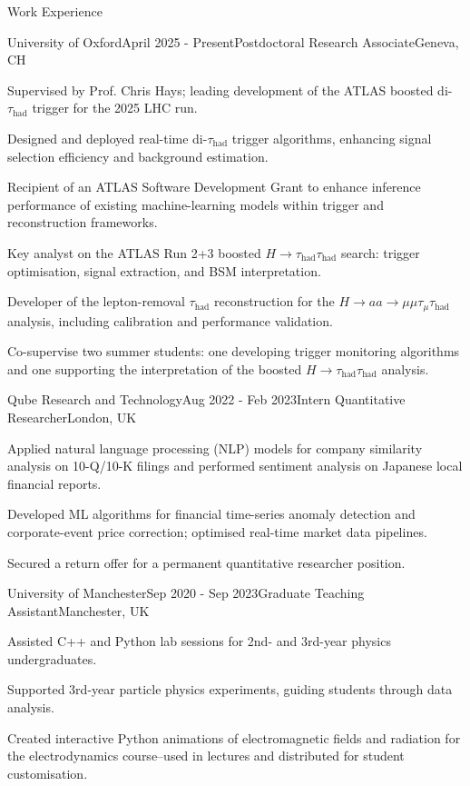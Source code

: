 \documentclass[11pt]{resume} %
\begin{document}
    \nocite{*}

    \begin{rSection}{Work Experience}
        \begin{rSubsection}{University of Oxford}{April 2025 - Present}{Postdoctoral Research Associate}{Geneva, CH}
            \item Supervised by Prof. Chris Hays; leading development of the ATLAS boosted di-\(\tau_{\mathrm{had}}\) trigger for the 2025 LHC run.
            \item Designed and deployed real-time di-\(\tau_{\mathrm{had}}\) trigger algorithms, enhancing signal selection efficiency and background estimation.
            \item Recipient of an ATLAS Software Development Grant to enhance inference performance of existing machine-learning models within trigger and reconstruction frameworks.
            \item Key analyst on the ATLAS Run 2+3 boosted \(H\to\tau_{\mathrm{had}}\tau_{\mathrm{had}}\) search: trigger optimisation, signal extraction, and BSM interpretation.
            \item Developer of the lepton-removal \(\tau_{\mathrm{had}}\) reconstruction for the \(H\to aa\to\mu\mu\tau_{\mu}\tau_{\mathrm{had}}\) analysis, including calibration and performance validation.
            \item Co-supervise two summer students: one developing trigger monitoring algorithms and one supporting the interpretation of the boosted \(H\to\tau_{\mathrm{had}}\tau_{\mathrm{had}}\) analysis.
        \end{rSubsection}
        \begin{rSubsection}{Qube Research and Technology}{Aug 2022 - Feb 2023}{Intern Quantitative Researcher}{London, UK}
            \item Applied natural language processing (NLP) models for company similarity analysis on 10-Q/10-K filings and performed sentiment analysis on Japanese local financial reports.
            \item Developed ML algorithms for financial time-series anomaly detection and corporate-event price correction; optimised real-time market data pipelines.
            \item Secured a return offer for a permanent quantitative researcher position.
        \end{rSubsection}
        \begin{rSubsection}{University of Manchester}{Sep 2020 - Sep 2023}{Graduate Teaching Assistant}{Manchester, UK}
            \item Assisted C++ and Python lab sessions for 2nd- and 3rd-year physics undergraduates.
            \item Supported 3rd-year particle physics experiments, guiding students through data analysis.
            \item Created interactive Python animations of electromagnetic fields and radiation for the electrodynamics course--used in lectures and distributed for student customisation.
        \end{rSubsection}
    \end{rSection}
\end{document}
